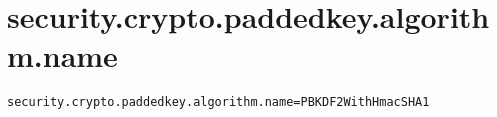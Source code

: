 \section{security.crypto.paddedkey.algorithm.name}
\label{configuration:SecurityCryptoPaddedkeyAlgorithmName}
\ClearAPI
\TODO
{}
\begin{lstlisting}[style=Props,caption={Usage example for \textit{security.crypto.paddedkey.algorithm.name}}]
security.crypto.paddedkey.algorithm.name=PBKDF2WithHmacSHA1
\end{lstlisting}
